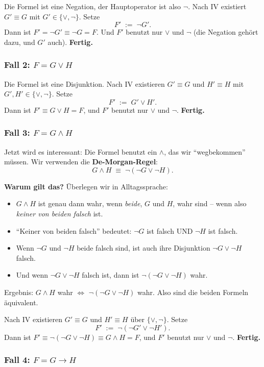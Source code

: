 \documentclass[a4paper,12pt]{article}
\begin{document}
Die Formel ist eine Negation, der Hauptoperator ist also $\neg$. Nach
IV existiert $G' \equiv G$ mit $G' \in \{\vee, \neg\}$. Setze
\[
F' \;:=\; \neg G'.
\]
Dann ist $F' = \neg G' \equiv \neg G = F$. Und $F'$ benutzt nur
$\vee$ und $\neg$ (die Negation geh\"ort dazu, und $G'$ auch).
\textbf{Fertig.}

\subsubsection*{Fall 2: $F = G \vee H$}

Die Formel ist eine Disjunktion. Nach IV existieren
$G' \equiv G$ und $H' \equiv H$ mit $G', H' \in \{\vee, \neg\}$.
Setze
\[
F' \;:=\; G' \vee H'.
\]
Dann ist $F' \equiv G \vee H = F$, und $F'$ benutzt nur $\vee$ und
$\neg$. \textbf{Fertig.}

\subsubsection*{Fall 3: $F = G \wedge H$}

Jetzt wird es interessant: Die Formel benutzt ein $\wedge$, das wir
"`wegbekommen"' m\"ussen. Wir verwenden die \textbf{De-Morgan-Regel}:
\[
G \wedge H \;\equiv\; \neg(\neg G \vee \neg H).
\]

\textbf{Warum gilt das?} \"Uberlegen wir in Alltagssprache:
\begin{itemize}[nosep]
\item $G \wedge H$ ist genau dann wahr, wenn \emph{beide}, $G$ und
      $H$, wahr sind -- wenn also \emph{keiner von beiden falsch}
      ist.
\item "`Keiner von beiden falsch"' bedeutet: $\neg G$ ist falsch UND
      $\neg H$ ist falsch.
\item Wenn $\neg G$ und $\neg H$ beide falsch sind, ist auch ihre
      Disjunktion $\neg G \vee \neg H$ falsch.
\item Und wenn $\neg G \vee \neg H$ falsch ist, dann ist
      $\neg(\neg G \vee \neg H)$ wahr.
\end{itemize}
Ergebnis: $G \wedge H$ wahr $\iff$ $\neg(\neg G \vee \neg H)$ wahr.
Also sind die beiden Formeln \"aquivalent. \checkmark

Nach IV existieren $G' \equiv G$ und $H' \equiv H$ \"uber
$\{\vee, \neg\}$. Setze
\[
F' \;:=\; \neg(\neg G' \vee \neg H').
\]
Dann ist $F' \equiv \neg(\neg G \vee \neg H) \equiv G \wedge H = F$,
und $F'$ benutzt nur $\vee$ und $\neg$. \textbf{Fertig.}

\subsubsection*{Fall 4: $F = G \to H$}
\end{document}
